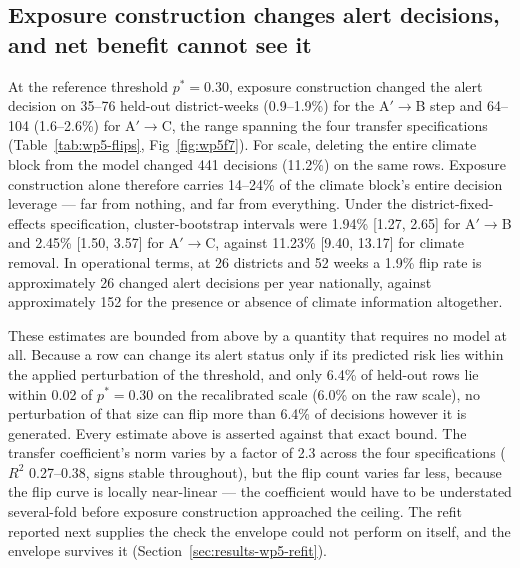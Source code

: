 \subsection{Exposure construction changes alert decisions, and net benefit cannot see it}
\label{sec:results-wp5-decision}

At the reference threshold $p^*=0.30$, exposure construction changed the alert decision on 35--76 held-out district-weeks (0.9--1.9\%) for the A$'\to$B step and 64--104 (1.6--2.6\%) for A$'\to$C, the range spanning the four transfer specifications (Table~\ref{tab:wp5-flips}, Fig~\ref{fig:wp5f7}). For scale, deleting the entire climate block from the model changed 441 decisions (11.2\%) on the same rows. Exposure construction alone therefore carries 14--24\% of the climate block's entire decision leverage --- far from nothing, and far from everything. Under the district-fixed-effects specification, cluster-bootstrap intervals were 1.94\% [1.27, 2.65] for A$'\to$B and 2.45\% [1.50, 3.57] for A$'\to$C, against 11.23\% [9.40, 13.17] for climate removal. In operational terms, at 26 districts and 52 weeks a 1.9\% flip rate is approximately 26 changed alert decisions per year nationally, against approximately 152 for the presence or absence of climate information altogether.

These estimates are bounded from above by a quantity that requires no model at all. Because a row can change its alert status only if its predicted risk lies within the applied perturbation of the threshold, and only 6.4\% of held-out rows lie within 0.02 of $p^*=0.30$ on the recalibrated scale (6.0\% on the raw scale), no perturbation of that size can flip more than 6.4\% of decisions however it is generated. Every estimate above is asserted against that exact bound. The transfer coefficient's norm varies by a factor of 2.3 across the four specifications ($R^2$ 0.27--0.38, signs stable throughout), but the flip count varies far less, because the flip curve is locally near-linear --- the coefficient would have to be understated several-fold before exposure construction approached the ceiling. The refit reported next supplies the check the envelope could not perform on itself, and the envelope survives it (Section~\ref{sec:results-wp5-refit}).

